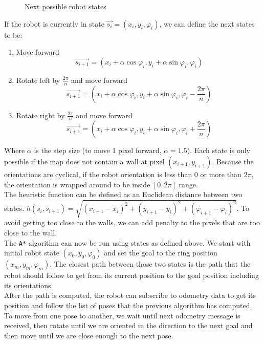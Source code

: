 \documentclass[12pt,a4paper]{article}
\begin{document}
	\begin{figure}[h]
		\centering
		\vspace{6cm}
		\caption{Next possible robot states}
		\label{fig:next_robot_states}
	\end{figure}
	
	If the robot is currently in state $\vec{s_i} = (x_i, y_i, \varphi_i)$, we can define the next states to be:
	
	\begin{enumerate}
		\item Move forward
		$$\vec{s_{i+1}} = (x_i + \alpha \cos \varphi_i, y_i + \alpha \sin \varphi_i, \varphi_i)$$
		\item Rotate left by $\frac{2\pi}{n}$ and move forward
		$$\vec{s_{i+1}} = (x_i + \alpha \cos \varphi_i, y_i + \alpha \sin \varphi_i, \varphi_i - \frac{2\pi}{n})$$
		\item Rotate right by $\frac{2\pi}{n}$ and move forward
		$$\vec{s_{i+1}} = (x_i + \alpha \cos \varphi_i, y_i + \alpha \sin \varphi_i, \varphi_i + \frac{2\pi}{n})$$
	\end{enumerate}
	
	Where $\alpha$ is the step size (to move 1 pixel forward, $\alpha = 1.5$). Each state is only possible if the map does not contain a wall at pixel $(x_{i+1}, y_{i+1})$. Because the orientations are cyclical, if the robot orientation is less than $0$ or more than $2\pi$, the orientation is wrapped around to be inside $[0, 2\pi]$ range. \\
	
	The heuristic function can be defined as an Euclidean distance between two states. $h(s_i, s_{i+1}) = \sqrt{(x_{i + 1} - x_i)^2 + (y_{i + 1} - y_i)^2 + (\varphi_{i + 1} - \varphi_i)^2}$. To avoid getting too close to the walls, we can add penalty to the pixels that are too close to the wall. \\
	
	The \texttt{A*} algorithm can now be run using states as defined above. We start with initial robot state $(x_0, y_0, \varphi_0)$ and set the goal to the ring position $(x_m, y_m, \varphi_m)$. The closest path between those two states is the path that the robot should follow to get from its current position to the goal position including its orientations. \\
	
	After the path is computed, the robot can subscribe to odometry data to get its position and follow the list of poses that the previous algorithm has computed. To move from one pose to another, we wait until next odometry message is received, then rotate until we are oriented in the direction to the next goal and then move until we are close enough to the next pose. \\
	
\end{document}

